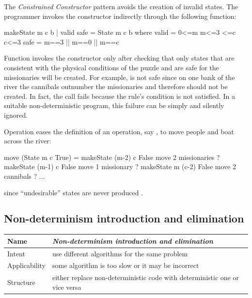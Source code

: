The \emph{Constrained Constructor} pattern avoids
the creation of invalid states.
The programmer invokes the constructor indirectly
through the following function:
%
\begin{prog}
makeState m c b | valid \boolAnd safe = State m c b
   where valid = 0<=m \boolAnd m<=3 <=c \boolAnd c<=3
         safe  = m==3 || m==0 || m==c
\end{prog}
%
Function  invokes the constructor only
after checking that only states
that are consistent with the physical conditions of the
puzzle and are safe for the missionaries will be created.
For example, 
 is not safe since on one bank of the river
the cannibals outnumber the missionaries
and therefore should not be created.
In fact, the call  fails because
the rule's condition is not satisfied.
In a suitable non-deterministic program, this failure can be
simply and silently ignored.

Operation  eases the definition of an operation,
say , to move people and boat across the river:
%
\begin{prog}
move (State m c True)
   = makeState (m-2) c False      \lineComment move 2 missionaries
   ? makeState (m-1) c False      \lineComment move 1 missionary
   ? makeState m (c-2) False      \lineComment move 2 cannibals
   ? ...
\end{prog}
%
since ``undesirable'' states are never produced
.

\subsection{Non-determinism introduction and elimination}
\label{Non-determinism introduction and elimination}

\begin{center}
\begin{tabular}{@{} | *{2}{@{\hspace{3pt}} l @{\hspace{3pt}} |} @{}}
\hline
Name & \emph{Non-determinism introduction and elimination} \\
\hline 
Intent & use different algorithms for the same problem \\
\hline
Applicability & some algorithm is too slow or it may be incorrect \\
\hline
Structure & either replace non-deterministic code with deterministic one or vice versa \\
\hline
\end{tabular}
\end{center}

